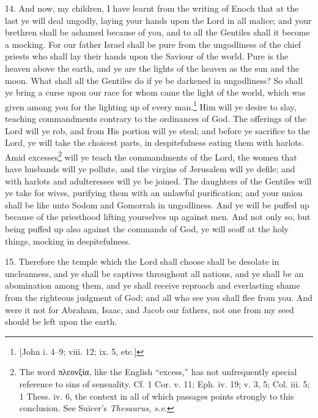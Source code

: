 14. And now, my children, I have learnt from the writing of Enoch that at the last ye will deal ungodly, laying your hands upon the Lord in all malice; and your brethren shall be ashamed because of you, and to all the Gentiles shall it become a mocking. For our father Israel shall be pure from the ungodliness of the chief priests who shall lay their hands upon the Saviour of the world. Pure is the heaven above the earth, and ye are the lights of the heaven as the sun and the moon. What shall all the Gentiles do if ye be darkened in ungodliness? So shall ye bring a curse upon our race for whom came the light of the world, which was given among you for the lighting up of every man.\footnote{[John i. 4–9; viii. 12; ix. 5, etc.]} Him will ye desire to slay, teaching commandments contrary to the ordinances of God. The offerings of the Lord will ye rob, and from His portion will ye steal; and before ye sacrifice to the Lord, ye will take the choicest parts, in despitefulness eating them with harlots. Amid excesses\footnote{The word \textgreek{πλεονξία}, like the English “excess,” has not unfrequently special reference to sins of sensuality. Cf. 1 Cor. v. 11; Eph. iv. 19; v. 3, 5; Col. iii. 5; 1 Thess. iv. 6, the context in all of which passages points strongly to this conclusion. See Suicer’s \emph{Thesaurus, s.v.}} will ye teach the commandments of the Lord, the women that have husbands will ye pollute, and the virgins of Jerusalem will ye defile; and with harlots and adulteresses will ye be joined. The daughters of the Gentiles will ye take for wives, purifying them with an unlawful purification; and your union shall be like unto Sodom and Gomorrah in ungodliness. And ye will be puffed up because of the priesthood lifting yourselves up against men. And not only so, but being puffed up also against the commands of God, ye will scoff at the holy things, mocking in despitefulness.

15. Therefore the temple which the Lord shall choose shall be desolate in uncleanness, and ye shall be captives throughout all nations, and ye shall be an abomination among them, and ye shall receive reproach and everlasting shame from the righteous judgment of God; and all who see you shall flee from you. And were it not for Abraham, Isaac, and Jacob our fathers, not one from my seed should be left upon the earth.

